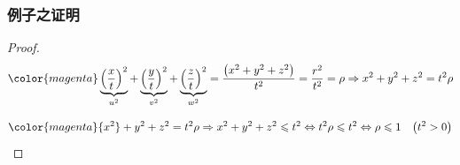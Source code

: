 \documentclass[aspectratio=2516]{beamer}
\begin{document}
\begin{frame}
\frametitle{\kaishu 例子之证明}

\kaishu

\begin{proof}
	
	\kaishu
	
	\begin{equation}
	\color{magenta}
		\underbrace {{{\left( {\frac{x}{t}} \right)}^2}}_{{u^2}} + \underbrace {{{\left( {\frac{y}{t}} \right)}^2}}_{{v^2}} + \underbrace {{{\left( {\frac{z}{t}} \right)}^2}}_{{w^2}} = \frac{{\left( {{x^2} + {y^2} + {z^2}} \right)}}{{{t^2}}} = \frac{{{r^2}}}{{{t^2}}} = \rho  \Rightarrow {x^2} + {y^2} + {z^2} = {t^2}\rho 
	\notag 
	\end{equation}
	
	\begin{equation}
	\color{magenta}
		{x^2} + {y^2} + {z^2} = {t^2}\rho  \Rightarrow {x^2} + {y^2} + {z^2} \leqslant {t^2} \Leftrightarrow {t^2}\rho  \leqslant {t^2} \Leftrightarrow \rho  \leqslant 1\;\;\;\left( {{t^2} > 0} \right)
	\notag 
	\end{equation}
		
\end{proof}

\end{frame}

\end{document}
